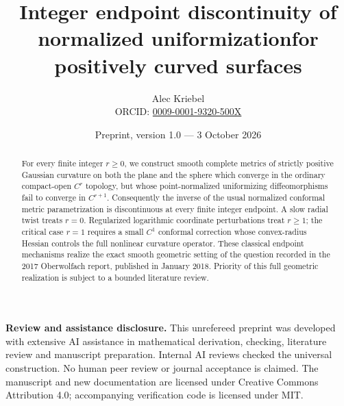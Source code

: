 \documentclass[11pt]{article}
\title{Integer endpoint discontinuity of normalized uniformization\newline for positively curved surfaces}
\author{Alec Kriebel\\\small ORCID: \href{https://orcid.org/0009-0001-9320-500X}{0009-0001-9320-500X}}
\date{Preprint, version 1.0 --- 3 October 2026}
\begin{document}
\maketitle
\begin{abstract}
For every finite integer $r\geq0$, we construct smooth complete metrics of strictly positive Gaussian curvature on both the plane and the sphere which converge in the ordinary compact-open $C^r$ topology, but whose point-normalized uniformizing diffeomorphisms fail to converge in $C^{r+1}$. Consequently the inverse of the usual normalized conformal metric parametrization is discontinuous at every finite integer endpoint. A slow radial twist treats $r=0$. Regularized logarithmic coordinate perturbations treat $r\geq1$; the critical case $r=1$ requires a small $C^1$ conformal correction whose convex-radius Hessian controls the full nonlinear curvature operator. These classical endpoint mechanisms realize the exact smooth geometric setting of the question recorded in the 2017 Oberwolfach report, published in January 2018. Priority of this full geometric realization is subject to a bounded literature review.
\end{abstract}

\noindent\textbf{Review and assistance disclosure.} This unrefereed preprint was developed with extensive AI assistance in mathematical derivation, checking, literature review and manuscript preparation. Internal AI reviews checked the universal construction. No human peer review or journal acceptance is claimed. The manuscript and new documentation are licensed under Creative Commons Attribution 4.0; accompanying verification code is licensed under MIT.
\end{document}
